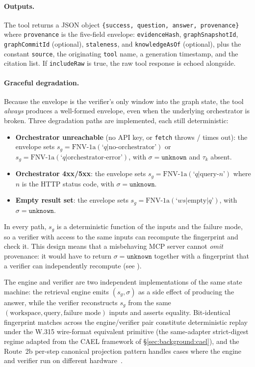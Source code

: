 \documentclass[conference]{IEEEtran}
\begin{document}
\paragraph{Outputs.} The tool returns a JSON object
\texttt{\{success, question, answer, provenance\}} where
\texttt{provenance} is the five-field envelope:
\texttt{evidenceHash}, \texttt{graphSnapshotId}, \texttt{graphCommitId}
(optional), \texttt{staleness}, and \texttt{knowledgeAsOf} (optional),
plus the constant \texttt{source}, the originating \texttt{tool} name,
a generation timestamp, and the citation list. If \texttt{includeRaw}
is true, the raw tool response is echoed alongside.

\paragraph{Graceful degradation.} Because the envelope is the verifier's
only window into the graph state, the tool \emph{always} produces a
well-formed envelope, even when the underlying orchestrator is broken.
Three degradation paths are implemented, each still deterministic:

\begin{itemize}
  \item \textbf{Orchestrator unreachable} (no API key, or
    \texttt{fetch} throws / times out): the envelope sets
    $s_g = \text{FNV-1a}(\text{`}q\text{|no-orchestrator'})$ or
    $s_g = \text{FNV-1a}(\text{`}q\text{|orchestrator-error'})$, with
    $\sigma = \texttt{unknown}$ and $\tau_k$ absent.
  \item \textbf{Orchestrator 4xx/5xx}: the envelope sets
    $s_g = \text{FNV-1a}(\text{`}q\text{|query-}n\text{'})$ where
    $n$ is the HTTP status code, with $\sigma = \texttt{unknown}$.
  \item \textbf{Empty result set}: the envelope sets
    $s_g = \text{FNV-1a}(\text{`}\textit{ws}\text{|empty|}q\text{'})$,
    with $\sigma = \texttt{unknown}$.
\end{itemize}

In every path, $s_g$ is a deterministic function of the inputs and the
failure mode, so a verifier with access to the same inputs can recompute
the fingerprint and check it. This design means that a misbehaving MCP
server cannot \emph{omit} provenance: it would have to return
$\sigma = \texttt{unknown}$ together with a fingerprint that a verifier
can independently recompute (see ).

The engine and verifier are two independent implementations of the same
state machine: the retrieval engine emits $(s_g, \sigma)$ as a side
effect of producing the answer, while the verifier reconstructs $s_g$
from the same $(\text{workspace}, \text{query}, \text{failure mode})$
inputs and asserts equality. Bit-identical fingerprint matches across
the engine/verifier pair constitute deterministic replay under the
W.315 wire-format equivalent primitive (the same-adapter strict-digest
regime adapted from the CAEL framework of \S\ref{sec:background:cael}),
and the Route~2b per-step canonical projection pattern handles cases
where the engine and verifier run on different
hardware~\cite{paper-0c-twin-test-2026-05-11}.
\end{document}
